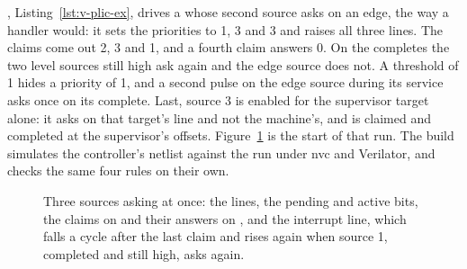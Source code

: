 \documentclass[journal,onecolumn,9pt]{IEEEtran}
\newcommand{\plicpart}[3]{%
}
\begin{document}
, Listing~\ref{lst:v-plic-ex}, drives a 
whose second source asks on an edge, the way a handler would: it sets
the priorities to 1, 3 and 3 and raises all three lines. The claims
come out 2, 3 and 1, and a fourth claim answers 0. On the completes the
two level sources still high ask again and the edge source does not. A
threshold of 1 hides a priority of 1, and a second pulse on the edge
source during its service asks once on its complete. Last, source 3
is enabled for the supervisor target alone: it asks on that target's
line and not the machine's, and is claimed and completed at the
supervisor's offsets.
Figure~\ref{fig:v-plic} is the start of that run. The build simulates
the controller's netlist against the run under nvc and Verilator, and
 checks the same four rules on their
own.

\begin{figure}[htbp]
\centering

\caption{Three sources asking at once: the lines, the pending and
active bits, the claims on  and their answers on ,
and the interrupt line, which falls a cycle after the last claim and
rises again when source 1, completed and still high, asks again.}
\label{fig:v-plic}
\end{figure}

\plicpart{gateway}{The gateway: the lines as one word, and the
requests that go forward.}{lst:v-plic-gateway}

\plicpart{choice}{The choice of the source a claim takes.}%
{lst:v-plic-choice}

\plicpart{bus}{The words on the bus, the claim and the complete.}%
{lst:v-plic-bus}

\plicpart{drives}{The drives: the requests, the registers and the
line.}{lst:v-plic-drives}




\end{document}
